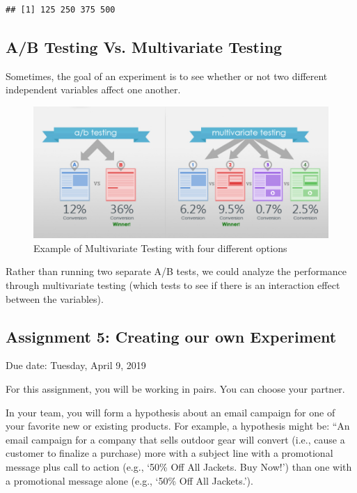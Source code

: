 \documentclass[]{article}
\begin{document}
\begin{verbatim}
## [1] 125 250 375 500
\end{verbatim}

\subsection{A/B Testing Vs. Multivariate
Testing}\label{ab-testing-vs.-multivariate-testing}

Sometimes, the goal of an experiment is to see whether or not two
different independent variables affect one another.

\begin{figure}
\centering
\includegraphics{docs/multivariate.jpg}
\caption{Example of Multivariate Testing with four different options}
\end{figure}

Rather than running two separate A/B tests, we could analyze the
performance through multivariate testing (which tests to see if there is
an interaction effect between the variables).

\subsection{Assignment 5: Creating our own
Experiment}\label{assignment-5-creating-our-own-experiment}

Due date: Tuesday, April 9, 2019

For this assignment, you will be working in pairs. You can choose your
partner.

In your team, you will form a hypothesis about an email campaign for one
of your favorite new or existing products. For example, a hypothesis
might be: ``An email campaign for a company that sells outdoor gear will
convert (i.e., cause a customer to finalize a purchase) more with a
subject line with a promotional message plus call to action (e.g., `50\%
Off All Jackets. Buy Now!') than one with a promotional message alone
(e.g., `50\% Off All Jackets.').
\end{document}
